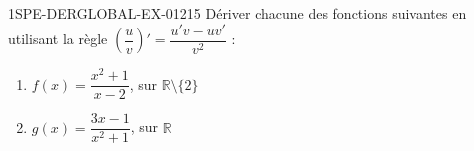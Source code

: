 \begin{exercice}{1SPE-DERGLOBAL-EX-012}{1}{5}
Dériver chacune des fonctions suivantes en utilisant la règle $\left(\dfrac{u}{v}\right)' = \dfrac{u'v - uv'}{v^2}$ :
\begin{enumerate}
  \item $f(x) = \dfrac{x^2+1}{x-2}$, sur $\mathbb{R} \setminus \{2\}$
  \item $g(x) = \dfrac{3x-1}{x^2+1}$, sur $\mathbb{R}$
\end{enumerate}
\end{exercice}
